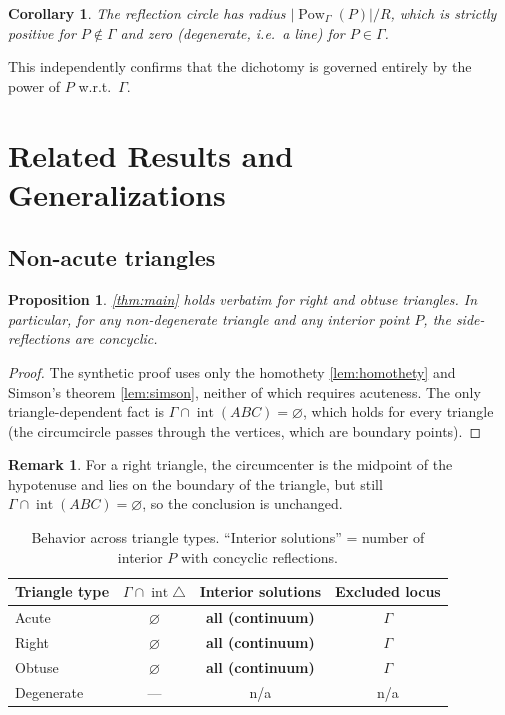 \documentclass[11pt,a4paper]{article}
\newtheorem{proposition}[theorem]{Proposition}
\newtheorem{corollary}[theorem]{Corollary}
\theoremstyle{definition}
\newtheorem{remark}[theorem]{Remark}
\newcommand{\circc}{\Gamma}
\begin{document}
\begin{corollary}\label{cor:trig}
The reflection circle has radius $|\operatorname{Pow}_{\circc}(P)|/R$, which is strictly positive for $P\notin\circc$ and zero (degenerate, i.e.\ a line) for $P\in\circc$.
\end{corollary}

This independently confirms that the dichotomy is governed entirely by the power of $P$ w.r.t.\ $\circc$.

\section{Related Results and Generalizations}\label{sec:related}

\subsection{Non-acute triangles}

\begin{proposition}\label{prop:nonacute}
\cref{thm:main} holds verbatim for right and obtuse triangles. In particular, for any non-degenerate triangle and any interior point $P$, the side-reflections are concyclic.
\end{proposition}
\begin{proof}
The synthetic proof uses only the homothety \cref{lem:homothety} and Simson's theorem \cref{lem:simson}, neither of which requires acuteness. The only triangle-dependent fact is $\circc\cap\operatorname{int}(ABC)=\varnothing$, which holds for every triangle (the circumcircle passes through the vertices, which are boundary points).
\end{proof}

\begin{remark}
For a right triangle, the circumcenter is the midpoint of the hypotenuse and lies on the boundary of the triangle, but still $\circc\cap\operatorname{int}(ABC)=\varnothing$, so the conclusion is unchanged.
\end{remark}

\begin{table}[h]
\centering
\caption{Behavior across triangle types. ``Interior solutions'' = number of interior $P$ with concyclic reflections.}
\label{tab:cases}
\begin{tabular}{lccc}
\toprule
Triangle type & $\circc\cap\operatorname{int}\triangle$ & Interior solutions & Excluded locus \\
\midrule
Acute & $\varnothing$ & \textbf{all (continuum)} & $\circc$ \\
Right & $\varnothing$ & \textbf{all (continuum)} & $\circc$ \\
Obtuse & $\varnothing$ & \textbf{all (continuum)} & $\circc$ \\
Degenerate & --- & n/a & n/a \\
\bottomrule
\end{tabular}
\end{table}
\end{document}
